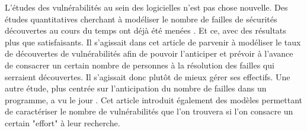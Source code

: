 L'études des vulnérabilités au sein des logicielles n'est pas chose nouvelle. Des études quantitatives cherchant à modéliser le
nombre de failles de sécurités découvertes au cours du temps ont déjà été menées \cite{vulnerabilityDiscovery}. Et ce, avec des
résultats plus que satisfaisants. Il s'agissait dans cet article de parvenir à modéliser le taux de découvertes de vulnérabilités
afin de pouvoir l'anticiper et prévoir à l'avance de consacrer un certain nombre de personnes à la résolution des failles qui
serraient découvertes. Il s'agissait donc plutôt de mieux gérer ses effectifs. Une autre étude, plus centrée sur l'anticipation du
nombre de failles dans un programme, a vu le jour \cite{assessingVulnerabilities}. Cet article introduit également des modèles
permettant de caractériser le nombre de vulnérabilités que l'on trouvera si l'on consacre un certain "effort" à leur recherche.
